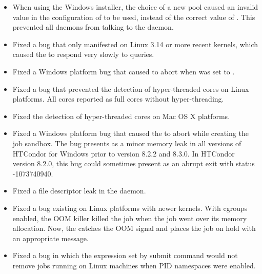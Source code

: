 \begin{itemize}

\item When using the Windows installer,
the choice of a new pool caused an invalid value in the configuration of 
 to be used, 
instead of the correct value of .
This prevented all daemons from talking to the  daemon.

\item Fixed a bug that only manifested on Linux 3.14 or more recent kernels, 
which caused the  to respond very slowly to queries.

\item Fixed a Windows platform bug that caused  to abort
when  was set to . 

\item Fixed a bug that prevented the detection of hyper-threaded cores
on Linux platforms.
All cores reported as full cores without hyper-threading. 

\item Fixed the detection of hyper-threaded cores on Mac OS X platforms.

\item Fixed a Windows platform bug that caused the 
to abort while creating the job sandbox.
The bug presents as a minor memory leak in all versions of HTCondor 
for Windows prior to version 8.2.2 and 8.3.0.
In HTCondor version 8.2.0, this bug could sometimes
present as an abrupt  exit with status -1073740940. 

\item Fixed a file descriptor leak in the 
daemon.

\item Fixed a bug existing on Linux platforms with newer kernels.
With cgroups enabled, the OOM killer killed the job when the job
went over its memory allocation.  
Now, the  catches the OOM signal and 
places the job on hold with an appropriate message.

\item Fixed a bug in which the expression set by submit command 
 would not remove
jobs running on Linux machines when PID namespaces were enabled.


\end{itemize}
